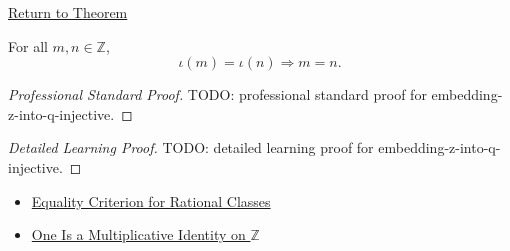 \newpage
{}
\label{prf:embedding-z-into-q-injective}

\begin{remark*}[Return]
\hyperref[thm:embedding-z-into-q-injective]{Return to Theorem}
\end{remark*}

\begin{theorem*}
For all $m,n\in\mathbb{Z}$,
\[
\iota(m)=\iota(n)\Longrightarrow m=n.
\]
\end{theorem*}

\begin{proof}[Professional Standard Proof]
\LRAProofBodyStart
TODO: professional standard proof for embedding-z-into-q-injective.
\end{proof}

\begin{proof}[Detailed Learning Proof]
\LRAProofBodyStart
TODO: detailed learning proof for embedding-z-into-q-injective.
\end{proof}

\begin{remark*}
\end{remark*}

\begin{dependencies}
\begin{itemize}
  \item \hyperref[prop:equality-criterion-for-rational-classes]{Equality Criterion for Rational Classes}
  \item \hyperref[thm:one-multiplicative-identity-on-z]{One Is a Multiplicative Identity on $\mathbb{Z}$}
\end{itemize}
\end{dependencies}

\clearpage

